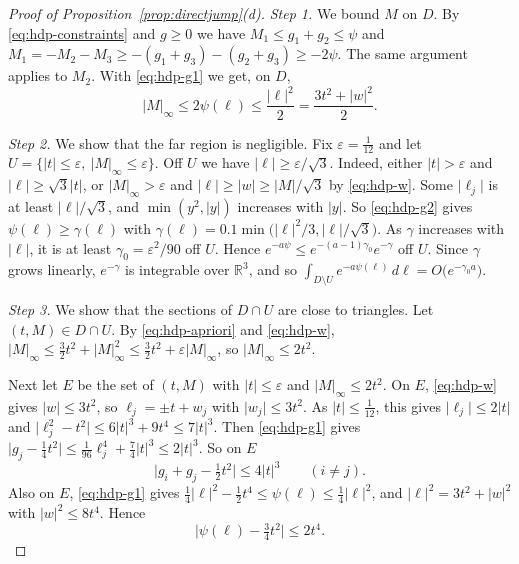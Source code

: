 \begin{proof}[Proof of Proposition~\ref{prop:directjump}\textup{(d)}]
\emph{Step 1.} We bound $M$ on $D$. By \eqref{eq:hdp-constraints} and
$g\ge0$ we have $M_1\le g_1+g_2\le\psi$ and
$M_1=-M_2-M_3\ge-(g_1+g_3)-(g_2+g_3)\ge-2\psi$. The same argument applies to
$M_2$. With \eqref{eq:hdp-g1} we get, on $D$,
\begin{equation}\label{eq:hdp-apriori}
 \lvert M\rvert_\infty\le2\psi(\ell)\le\frac{\lvert\ell\rvert^2}2
 =\frac{3t^2+\lvert w\rvert^2}2 .
\end{equation}

\emph{Step 2.} We show that the far region is negligible. Fix
$\varepsilon=\frac1{12}$ and let
$U=\{\lvert t\rvert\le\varepsilon,\ \lvert M\rvert_\infty\le\varepsilon\}$.
Off $U$ we have $\lvert\ell\rvert\ge\varepsilon/\sqrt3$. Indeed, either
$\lvert t\rvert>\varepsilon$ and $\lvert\ell\rvert\ge\sqrt3\lvert t\rvert$, or
$\lvert M\rvert_\infty>\varepsilon$ and
$\lvert\ell\rvert\ge\lvert w\rvert\ge\lvert M\rvert/\sqrt3$ by
\eqref{eq:hdp-w}. Some $\lvert\ell_j\rvert$ is at least
$\lvert\ell\rvert/\sqrt3$, and $\min(y^2,\lvert y\rvert)$ increases with
$\lvert y\rvert$. So \eqref{eq:hdp-g2} gives $\psi(\ell)\ge\gamma(\ell)$ with
$\gamma(\ell)=0.1\min\bigl(\lvert\ell\rvert^2/3,\lvert\ell\rvert/\sqrt3\bigr)$.
As $\gamma$ increases with $\lvert\ell\rvert$, it is at least
$\gamma_0=\varepsilon^2/90$ off $U$. Hence
$e^{-a\psi}\le e^{-(a-1)\gamma_0}e^{-\gamma}$ off $U$. Since $\gamma$ grows
linearly, $e^{-\gamma}$ is integrable over $\mathbb R^3$, and so
$\int_{D\setminus U}e^{-a\psi(\ell)}\,d\ell=O\bigl(e^{-\gamma_0a}\bigr)$.

\emph{Step 3.} We show that the sections of $D\cap U$ are close to
triangles. Let $(t,M)\in D\cap U$. By \eqref{eq:hdp-apriori} and
\eqref{eq:hdp-w},
$\lvert M\rvert_\infty\le\frac32t^2+\lvert M\rvert_\infty^2
\le\frac32t^2+\varepsilon\lvert M\rvert_\infty$, so
$\lvert M\rvert_\infty\le2t^2$.

Next let $E$ be the set of $(t,M)$ with $\lvert t\rvert\le\varepsilon$ and
$\lvert M\rvert_\infty\le2t^2$. On $E$, \eqref{eq:hdp-w} gives
$\lvert w\rvert\le3t^2$, so $\ell_j=\pm t+w_j$ with
$\lvert w_j\rvert\le3t^2$. As $\lvert t\rvert\le\frac1{12}$, this gives
$\lvert\ell_j\rvert\le2\lvert t\rvert$ and
$\lvert\ell_j^2-t^2\rvert\le6\lvert t\rvert^3+9t^4\le7\lvert t\rvert^3$. Then
\eqref{eq:hdp-g1} gives
$\lvert g_j-\frac14t^2\rvert\le\frac1{96}\ell_j^4+\frac74\lvert t\rvert^3
\le2\lvert t\rvert^3$. So on $E$
\begin{equation}\label{eq:hdp-pair}
 \bigl\lvert g_i+g_j-\tfrac12t^2\bigr\rvert\le4\lvert t\rvert^3
 \qquad(i\ne j).
\end{equation}
Also on $E$, \eqref{eq:hdp-g1} gives
$\frac14\lvert\ell\rvert^2-\frac12t^4\le\psi(\ell)\le\frac14\lvert\ell\rvert^2$,
and $\lvert\ell\rvert^2=3t^2+\lvert w\rvert^2$ with
$\lvert w\rvert^2\le8t^4$. Hence
\begin{equation}\label{eq:hdp-psi}
 \bigl\lvert\psi(\ell)-\tfrac34t^2\bigr\rvert\le2t^4 .
\end{equation}


\end{proof}
